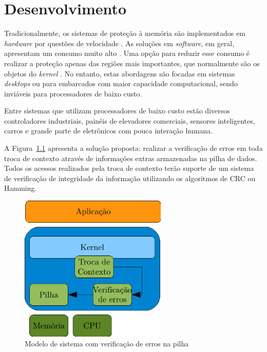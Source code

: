 \documentclass[12pt,openright,oneside,a4paper,brazil]{abntex2}
\begin{document}
\chapter{Desenvolvimento}

Tradicionalmente, os sistemas de proteção à memória são implementados em \textit{hardware} por questões de velocidade \cite{chaudhari2013framework,lemay2012cumulative}. As soluções em \textit{software}, em geral, apresentam um consumo muito alto \cite{pax2012h2hc,kai2012secure, yim2011hauberk,van2004new}. Uma opção para reduzir esse consumo é realizar a proteção apenas das regiões mais importantes, que normalmente são os objetos do \textit{kernel} \cite{borchert2013generative}. No entanto, estas abordagens são focadas em sistemas \textit{desktops} ou para embarcados com maior capacidade computacional, sendo inviáveis para processadores de baixo custo.

Entre sistemas que utilizam processadores de baixo custo estão diversos controladores industriais, painéis de elevadores comerciais, sensores inteligentes, carros e grande parte de eletrônicos com pouca interação humana.

A Figura~\ref{fig:KernelSeguro} apresenta a solução proposta: realizar a verificação de erros em toda troca de contexto através de informações extras armazenadas na pilha de dados. Todos os acessos realizados pela troca de contexto terão suporte de um sistema de verificação de integridade da informação utilizando os algoritmos de CRC ou Hamming.

\begin{figure}[htbp]
	\begin{center}
	\includegraphics[width=7cm]{img/interfaceKernelSeguro.pdf}
	\caption{Modelo de sistema com verificação de erros na pilha}
	\label{fig:KernelSeguro}
	\end{center}
\end{figure}
\end{document}
